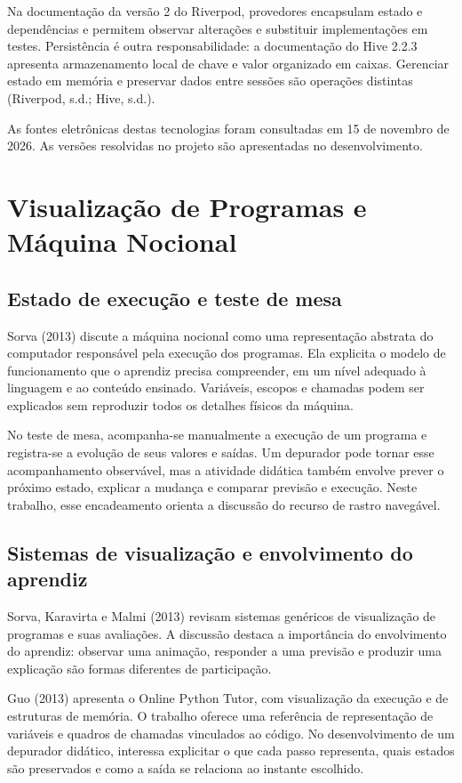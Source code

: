 \documentclass[
    12pt
    ,oneside
    ,a4paper
    ,chapter=TITLE
    ,section=TITLE
    ,sumario=abnt-6027-2012]{abntex2}
\begin{document}
Na documentação da versão 2 do Riverpod, provedores encapsulam estado e
dependências e permitem observar alterações e substituir implementações em testes.
Persistência é outra responsabilidade: a documentação do Hive 2.2.3 apresenta
armazenamento local de chave e valor organizado em caixas. Gerenciar estado em
memória e preservar dados entre sessões são operações distintas
(Riverpod, s.d.; Hive, s.d.).

As fontes eletrônicas destas tecnologias foram consultadas em 15 de novembro
de 2026. As versões resolvidas no projeto são apresentadas no desenvolvimento.

\section{Visualização de Programas e Máquina Nocional}
\label{sec:visualizacao_programas}

\subsection{Estado de execução e teste de mesa}
Sorva (2013) discute a máquina nocional como uma representação abstrata do
computador responsável pela execução dos programas. Ela explicita o modelo de
funcionamento que o aprendiz precisa compreender, em um nível adequado à
linguagem e ao conteúdo ensinado. Variáveis, escopos e chamadas podem ser
explicados sem reproduzir todos os detalhes físicos da máquina.

No teste de mesa, acompanha-se manualmente a execução de um programa e registra-se
a evolução de seus valores e saídas. Um depurador pode tornar esse acompanhamento
observável, mas a atividade didática também envolve prever o próximo estado,
explicar a mudança e comparar previsão e execução. Neste trabalho, esse
encadeamento orienta a discussão do recurso de rastro navegável.

\subsection{Sistemas de visualização e envolvimento do aprendiz}
Sorva, Karavirta e Malmi (2013) revisam sistemas genéricos de visualização de
programas e suas avaliações. A discussão destaca a importância do envolvimento
do aprendiz: observar uma animação, responder a uma previsão e produzir uma
explicação são formas diferentes de participação. 

Guo (2013) apresenta o Online Python Tutor, com visualização da execução e de
estruturas de memória. O trabalho oferece uma referência de representação de
variáveis e quadros de chamadas vinculados ao código. No desenvolvimento de um
depurador didático, interessa explicitar o que cada passo representa, quais
estados são preservados e como a saída se relaciona ao instante escolhido.
\end{document}
